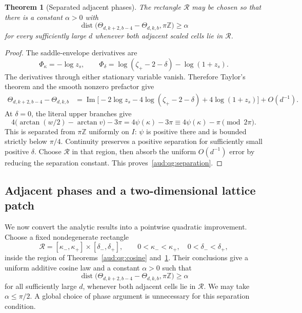 \documentclass[11pt,a4paper]{article}
\numberwithin{equation}{section}
\newtheorem{theorem}{Theorem}[section]
\begin{document}
\begin{theorem}[Separated adjacent phases]\label{aud:qg:increment}
The rectangle $\mathcal R$ may be chosen so that there is a constant $\alpha>0$ with
\begin{equation}\label{aud:qg:separation}
 \operatorname{dist}\bigl(\Theta_{d,k+2,b-4}-\Theta_{d,k,b},\pi\mathbb Z\bigr)
 \ge\alpha
\end{equation}
for every sufficiently large $d$ whenever both adjacent scaled cells lie in $\mathcal R$.
\end{theorem}
\begin{proof}
The saddle-envelope derivatives are
\[
 \Phi_\kappa=-\log z_s,\qquad
 \Phi_\delta=\log(\zeta_+-2-\delta)-\log(1+z_s).
\]
The derivatives through either stationary variable vanish. Therefore Taylor's theorem and the smooth nonzero prefactor give
\begin{align}
 \Theta_{d,k+2,b-4}-\Theta_{d,k,b}
 &=\operatorname{Im}\bigl[-2\log z_s-4\log(\zeta_+-2-\delta)
                         +4\log(1+z_s)\bigr]+O(d^{-1}).
 \label{aud:qg:incrementformula}
\end{align}
At $\delta=0$, the literal upper branches give
\begin{equation}\label{aud:qg:baseincrement}
 4\bigl(\arctan(w/2)-\arctan v\bigr)-3\pi
 =4\psi(\kappa)-3\pi
 \equiv4\psi(\kappa)-\pi\pmod{2\pi}.
\end{equation}
This is separated from $\pi\mathbb Z$ uniformly on $I$: $\psi$ is positive there and is bounded strictly below $\pi/4$. Continuity preserves a positive separation for sufficiently small positive $\delta$. Choose $\mathcal R$ in that region, then absorb the uniform $O(d^{-1})$ error by reducing the separation constant. This proves~\eqref{aud:qg:separation}.
\end{proof}
\subsection{Adjacent phases and a two-dimensional lattice patch}
We now convert the analytic results into a pointwise quadratic improvement. Choose a fixed nondegenerate rectangle
\[
 \mathcal R=[\kappa_-,\kappa_+]\times[\delta_-,\delta_+],
 \qquad 0<\kappa_-<\kappa_+,
 \quad 0<\delta_-<\delta_+,
\]
inside the region of Theorems~\ref{aud:qg:cosine} and~\ref{aud:qg:increment}. Their conclusions give a uniform additive cosine law and a constant $\alpha>0$ such that
\begin{equation}\label{aud:qg:adjacentseparation}
 \operatorname{dist}\bigl(\Theta_{d,k+2,b-4}-\Theta_{d,k,b},\pi\mathbb Z\bigr)
 \ge\alpha
\end{equation}
for all sufficiently large $d$, whenever both adjacent cells lie in $\mathcal R$. We may take $\alpha\le\pi/2$. A global choice of phase argument is unnecessary for this separation condition.
\end{document}

